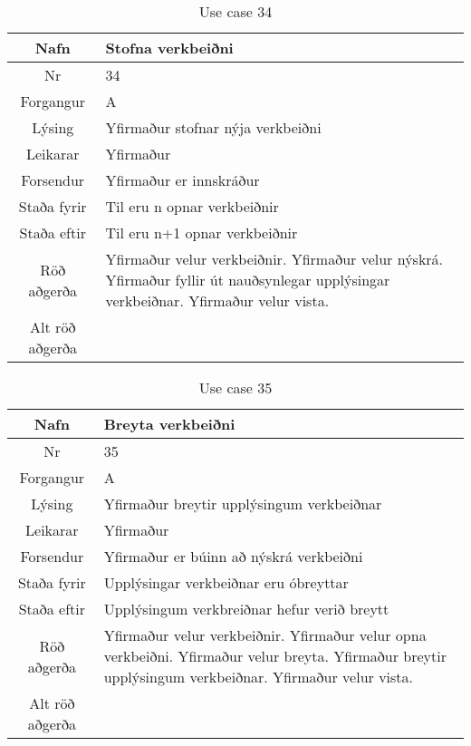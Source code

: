 \begin{table}[h!]\centering
\begin{tabular}{|c|p{10cm}|}
\hline
Nafn&Stofna verkbeiðni\\
\hline
Nr&34\\
\hline
Forgangur&A\\
\hline
Lýsing&Yfirmaður stofnar nýja verkbeiðni\\
\hline
Leikarar&Yfirmaður\\
\hline
Forsendur&Yfirmaður er innskráður\\
\hline
Staða fyrir&Til eru n opnar verkbeiðnir\\
\hline
Staða eftir&Til eru n+1 opnar verkbeiðnir\\
\hline
Röð aðgerða&Yfirmaður velur verkbeiðnir. Yfirmaður velur nýskrá. Yfirmaður fyllir út nauðsynlegar upplýsingar verkbeiðnar. Yfirmaður velur vista.\\
\hline
Alt röð aðgerða&\\
\hline
\end{tabular}
\caption{Use case 34}\label{tab:use_case_34}
\end{table}
\begin{table}[h!]\centering
\begin{tabular}{|c|p{10cm}|}
\hline
Nafn&Breyta verkbeiðni\\
\hline
Nr&35\\
\hline
Forgangur&A\\
\hline
Lýsing&Yfirmaður breytir upplýsingum verkbeiðnar\\
\hline
Leikarar&Yfirmaður\\
\hline
Forsendur&Yfirmaður er búinn að nýskrá verkbeiðni\\
\hline
Staða fyrir&Upplýsingar verkbeiðnar eru óbreyttar\\
\hline
Staða eftir&Upplýsingum verkbreiðnar hefur verið breytt\\
\hline
Röð aðgerða&Yfirmaður velur verkbeiðnir. Yfirmaður velur opna verkbeiðni. Yfirmaður velur breyta. Yfirmaður breytir upplýsingum verkbeiðnar. Yfirmaður velur vista.\\
\hline
Alt röð aðgerða&\\
\hline
\end{tabular}
\caption{Use case 35}\label{tab:use_case_35}
\end{table}
